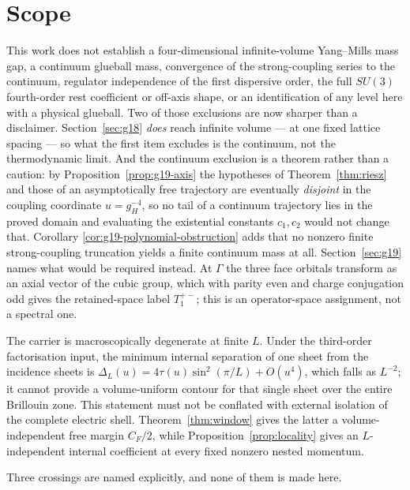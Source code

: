 \documentclass[11pt]{article}
\theoremstyle{plain}
\theoremstyle{definition}
\theoremstyle{remark}
\newcommand{\chk}[1]{}
\newcommand{\CF}{C_F}
\begin{document}
\section{Scope}
\label{sec:scope}

This work does not establish a four-dimensional infinite-volume Yang--Mills
mass gap, a continuum glueball mass, convergence of the strong-coupling series
to the continuum, regulator independence of the first dispersive order, the
full $SU(3)$ fourth-order rest coefficient or off-axis shape, or an
identification of any level here with a physical glueball. Two of those
exclusions are now sharper than a disclaimer.
Section~\ref{sec:g18} \emph{does} reach infinite volume --- at one fixed
lattice spacing --- so what the first item excludes is the continuum, not the
thermodynamic limit. And the continuum exclusion is a theorem rather than a
caution: by Proposition~\ref{prop:g19-axis} the hypotheses of
Theorem~\ref{thm:riesz} and those of an asymptotically free trajectory are
eventually \emph{disjoint} in the coupling coordinate $u=g_H^{-4}$, so no tail
of a continuum trajectory lies in the proved domain and evaluating the
existential constants $c_1,c_2$ would not change that. Corollary
\ref{cor:g19-polynomial-obstruction} adds that no nonzero finite
strong-coupling truncation yields a finite continuum mass at all.
Section~\ref{sec:g19} names what would be required instead. At $\Gamma$ the
three face orbitals transform as an axial vector of the cubic group, which
with parity even and charge conjugation odd gives the retained-space label
$T_1^{+-}$; this is an operator-space assignment, not a spectral one.

The carrier is macroscopically degenerate at finite $L$. Under the
third-order factorisation input, the minimum internal separation of one sheet
from the incidence sheets is
$\Delta_L(u)=4\tau(u)\sin^2(\pi/L)+O(u^4)$, which falls as $L^{-2}$; it cannot
provide a volume-uniform contour for that single sheet over the entire
Brillouin zone. This statement must not be conflated with external isolation
of the complete electric shell. Theorem~\ref{thm:window} gives the latter a
volume-independent free margin $\CF/2$, while
Proposition~\ref{prop:locality} gives an $L$-independent internal coefficient
at every fixed nonzero nested momentum.
\chk{Delta\_L = 4 tau(u) sin\^{}2(pi/L) is positive and falls as L\^{}-2}

Three crossings are named explicitly, and none of them is made here.
\end{document}
